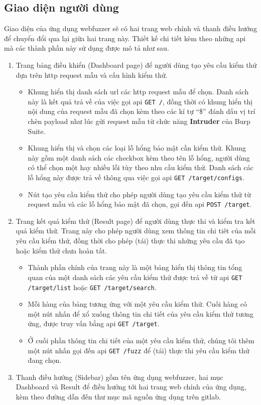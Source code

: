 \subsection{Giao diện người dùng}
Giao diện của ứng dụng webfuzzer sẽ có hai trang web chính và thanh điều hướng để chuyển đổi qua lại giữa hai trang này. Thiết kế chi tiết kèm theo những \acrshort{api} mà các thành phần này sử dụng được mô tả như sau.
\begin{enumerate}
    \item Trang bảng điều khiển (Dashboard page) để người dùng tạo yêu cầu kiểm thử dựa trên \acrshort{http} request mẫu và cấu hình kiểm thử.
    \begin{itemize}
        \item Khung hiển thị danh sách \acrshort{url} các \acrshort{http} request mẫu để chọn. Danh sách này là kết quả trả về của việc gọi \acrshort{api} \texttt{GET /}, đồng thời có khung hiển thị nội dung của request mẫu đã chọn kèm theo các kí tự ``\$'' đánh dấu vị trí chèn payload như lúc gửi request mẫu từ chức năng \textbf{Intruder} của Burp Suite.
        \item Khung hiển thị và chọn các loại lỗ hổng bảo mật cần kiểm thử. Khung này gồm một danh sách các checkbox kèm theo tên lỗ hổng, người dùng có thể chọn một hay nhiều lỗi tùy theo nhu cầu kiểm thử. Danh sách các lỗ hổng này được trả về thông qua việc gọi \acrshort{api} \texttt{GET /target/configs}.
        \item Nút tạo yêu cầu kiểm thử cho phép người dùng tạo yêu cầu kiểm thử từ request mẫu và các lỗ hổng bảo mật đã chọn, gọi đến \acrshort{api} \texttt{POST /target}.
    \end{itemize}
    \item Trang kết quả kiểm thử (Result page) để người dùng thực thi và kiểm tra kết quả kiểm thử. Trang này cho phép người dùng xem thông tin chi tiêt của mỗi yêu cầu kiểm thử, đồng thời cho phép (tái) thực thi những yêu cầu đã tạo hoặc kiểm thử chưa hoàn tất.
    \begin{itemize}
        \item Thành phần chính của trang này là một bảng hiển thị thông tin tổng quan của một danh sách các yêu cầu kiểm thử được trả về từ \acrshort{api} \texttt{GET /target/list} hoặc \texttt{GET /target/search}.
        \item Mỗi hàng của bảng tương ứng với một yêu cầu kiểm thử. Cuối hàng có một nút nhấn để xổ xuống thông tin chi tiết của yêu cầu kiểm thử tương ứng, được truy vấn bằng \acrshort{api} \texttt{GET /target}.
        \item Ở cuối phần thông tin chi tiết của một yêu cầu kiểm thử, chúng tôi thêm một nút nhấn gọi đến \acrshort{api} \texttt{GET /fuzz} để (tái) thực thi yêu cầu kiểm thử đang chọn.
    \end{itemize}
    \item Thanh điều hướng (Sidebar) gồm tên ứng dụng webfuzzer, hai mục Dashboard và Result để điều hướng tới hai trang web chính của ứng dụng, kèm theo đường dẫn đến thư mục mã nguồn ứng dụng trên gitlab.
\end{enumerate}
